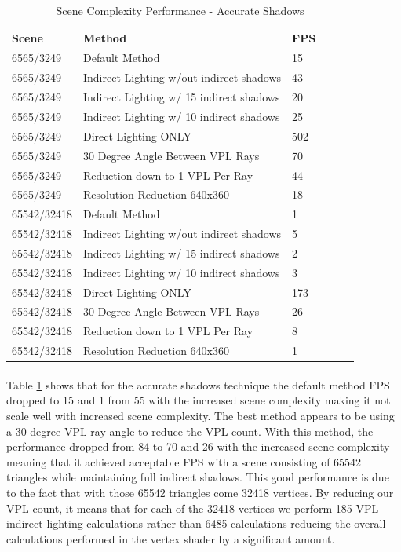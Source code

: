 \begin{table}[h!]
	\caption{Scene Complexity Performance - Accurate Shadows}
	\begin{center}
	    \begin{tabular}{ | l | l | l | l | l | l |}
	    \hline
	    Scene & Method & FPS\\ \hline
	    6565/3249 & Default Method & 15\\ \hline
	    6565/3249 & Indirect Lighting w/out indirect shadows & 43\\ \hline
	    6565/3249 & Indirect Lighting w/ 15 indirect shadows & 20\\ \hline
	    6565/3249 & Indirect Lighting w/ 10 indirect shadows & 25\\ \hline
	    6565/3249 & Direct Lighting ONLY & 502\\ \hline
	    6565/3249 & 30 Degree Angle Between VPL Rays & 70\\ \hline
	    6565/3249 & Reduction down to 1 VPL Per Ray & 44\\ \hline
	    6565/3249 & Resolution Reduction 640x360 & 18\\ \hline
	    \hline
	    \hline
	    65542/32418 & Default Method & 1\\ \hline
	    65542/32418 & Indirect Lighting w/out indirect shadows & 5\\ \hline
	    65542/32418 & Indirect Lighting w/ 15 indirect shadows & 2\\ \hline
	    65542/32418 & Indirect Lighting w/ 10 indirect shadows & 3\\ \hline
	    65542/32418 & Direct Lighting ONLY & 173\\ \hline
	    65542/32418 & 30 Degree Angle Between VPL Rays & 26\\ \hline
	    65542/32418 & Reduction down to 1 VPL Per Ray & 8\\ \hline
	    65542/32418 & Resolution Reduction 640x360 & 1\\ \hline
	    \end{tabular}
	\end{center}
	\label{table:tech1Complex}
\end{table}

\paragraph{}
Table \ref{table:tech1Complex} shows that for the accurate shadows technique the default method FPS dropped to 15 and 1 from 55 with the increased scene complexity making it not scale well with increased scene complexity.  The best method appears to be using a 30 degree VPL ray angle to reduce the VPL count.  With this method, the performance dropped from 84 to 70 and 26 with the increased scene complexity meaning that it achieved acceptable FPS with a scene consisting of 65542 triangles while maintaining full indirect shadows.  This good performance is due to the fact that with those 65542 triangles come 32418 vertices.  By reducing our VPL count, it means that for each of the 32418 vertices we perform 185 VPL indirect lighting calculations rather than 6485 calculations reducing the overall calculations performed in the vertex shader by a significant amount.

